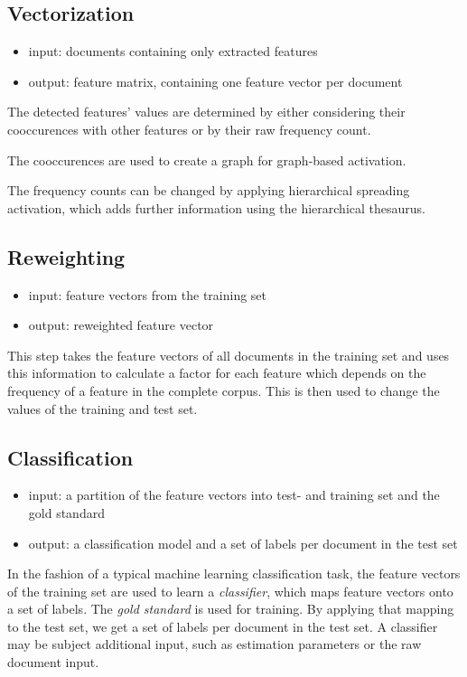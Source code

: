 \documentclass{article}
\begin{document}
\subsection{Vectorization}
\begin{itemize}
  \item input: documents containing only extracted features
  \item output: feature matrix, containing one feature vector per document
\end{itemize}
The detected features' values are determined by either considering their cooccurences with other features or by their
raw frequency count.

The cooccurences are used to create a graph for graph-based activation.

The frequency counts can be changed by applying hierarchical spreading activation,
which adds further information using the hierarchical thesaurus.
\subsection{Reweighting}
\begin{itemize}
  \item input: feature vectors from the training set
  \item output: reweighted feature vector
\end{itemize}
This step takes the feature vectors of all documents in the training set and uses this information
to calculate a factor for each feature which depends on
the frequency of a feature in the complete corpus.
This is then used to change the values of the training and test set.

\subsection{Classification}
\begin{itemize}
  \item input: a partition of the feature vectors into test- and training set
  and the gold standard
  \item output: a classification model and a set of labels per document in the
  test set
\end{itemize}
In the fashion of a typical machine learning classification task, the
feature vectors of the training set are used to learn a \emph{classifier},
which maps feature vectors onto a set of labels.
The \emph{gold standard} is used for training.
By applying that mapping to the test set, we get a set of labels per document in the test set.
A classifier may be subject additional input, such as estimation
 parameters or the raw document input.
\end{document}
